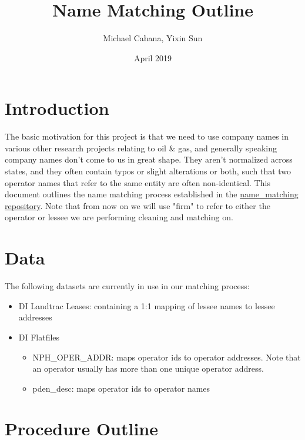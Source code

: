 \documentclass{article}
\title{Name Matching Outline}
\author{Michael Cahana, Yixin Sun}
\date{April 2019}
\begin{document}
\maketitle

\tableofcontents

\section{Introduction}
The basic motivation for this project is that we need to use company names in various other research projects relating to oil & gas, and generally speaking company names don't come to us in great shape. They aren't normalized across states, and they often contain typos or slight alterations or both, such that two operator names that refer to the same entity are often non-identical. 
This document outlines the name matching process established in the \href{https://github.com/m-cahana/name_matching}{name\_matching repository}. Note that from now on we will use "firm" to refer to either the operator or lessee we are performing cleaning and matching on. 

\section{Data}
The following datasets are currently in use in our matching process:
\begin{itemize}
    \item DI Landtrac Leases: containing a 1:1 mapping of lessee names to lessee addresses
    \item DI Flatfiles 
    \begin{itemize}
        \item NPH\_OPER\_ADDR: maps operator ids to operator addresses. Note that an operator usually has more than one unique operator address. 
        \item pden\_desc: maps operator ids to operator names
    \end{itemize}
\end{itemize}

\section{Procedure Outline}
\end{document}
